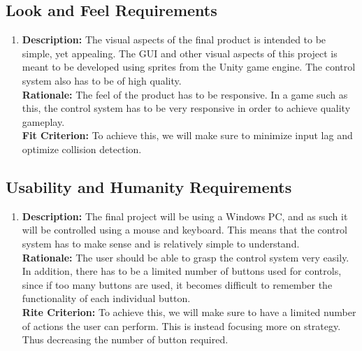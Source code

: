 \documentclass[12pt, titlepage]{article}
\begin{document}
\subsection{Look and Feel Requirements}
\begin{enumerate}[label=LF\arabic*]
\item \textbf{Description:} The visual aspects of the final product is intended to be simple, yet appealing. The GUI and other visual aspects of this project is meant to be developed using sprites from the Unity game engine. The control system also has to be of high quality.\\
\textbf{Rationale:} The feel of the product has to be responsive. In a game such as this, the control system has to be very responsive in order to achieve quality gameplay.\\
\textbf{Fit Criterion:} To achieve this, we will make sure to minimize input lag and optimize collision detection.

\end{enumerate}

\subsection{Usability and Humanity Requirements}
\begin{enumerate}[label=UH\arabic*]
\item \textbf{Description:} The final project will be using a Windows PC, and as such it will be controlled using a mouse and keyboard. This means that the control system has to make sense and is relatively simple to understand.\\
\textbf{Rationale:} The user should be able to grasp the control system very easily. In addition, there has to be a limited number of buttons used for controls, since if too many buttons are used, it becomes difficult to remember the functionality of each individual button.\\
\textbf{Rite Criterion:} To achieve this, we will make sure to have a limited number of actions the user can perform. This is instead focusing more on strategy. Thus decreasing the number of button required.

\end{enumerate}
\end{document}
